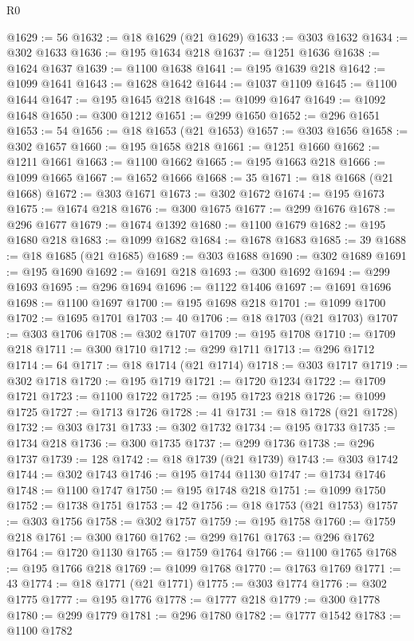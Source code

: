 \begin{lexlean}{R0}
\begin{coremodule}
@1629 := 56
@1632 := @18 @1629 (@21 @1629)
@1633 := @303 @1632
@1634 := @302 @1633
@1636 := @195 @1634 @218
@1637 := @1251 @1636
@1638 := @1624 @1637
@1639 := @1100 @1638
@1641 := @195 @1639 @218
@1642 := @1099 @1641
@1643 := @1628 @1642
@1644 := @1037 @1109
@1645 := @1100 @1644
@1647 := @195 @1645 @218
@1648 := @1099 @1647
@1649 := @1092 @1648
@1650 := @300 @1212
@1651 := @299 @1650
@1652 := @296 @1651
@1653 := 54
@1656 := @18 @1653 (@21 @1653)
@1657 := @303 @1656
@1658 := @302 @1657
@1660 := @195 @1658 @218
@1661 := @1251 @1660
@1662 := @1211 @1661
@1663 := @1100 @1662
@1665 := @195 @1663 @218
@1666 := @1099 @1665
@1667 := @1652 @1666
@1668 := 35
@1671 := @18 @1668 (@21 @1668)
@1672 := @303 @1671
@1673 := @302 @1672
@1674 := @195 @1673
@1675 := @1674 @218
@1676 := @300 @1675
@1677 := @299 @1676
@1678 := @296 @1677
@1679 := @1674 @1392
@1680 := @1100 @1679
@1682 := @195 @1680 @218
@1683 := @1099 @1682
@1684 := @1678 @1683
@1685 := 39
@1688 := @18 @1685 (@21 @1685)
@1689 := @303 @1688
@1690 := @302 @1689
@1691 := @195 @1690
@1692 := @1691 @218
@1693 := @300 @1692
@1694 := @299 @1693
@1695 := @296 @1694
@1696 := @1122 @1406
@1697 := @1691 @1696
@1698 := @1100 @1697
@1700 := @195 @1698 @218
@1701 := @1099 @1700
@1702 := @1695 @1701
@1703 := 40
@1706 := @18 @1703 (@21 @1703)
@1707 := @303 @1706
@1708 := @302 @1707
@1709 := @195 @1708
@1710 := @1709 @218
@1711 := @300 @1710
@1712 := @299 @1711
@1713 := @296 @1712
@1714 := 64
@1717 := @18 @1714 (@21 @1714)
@1718 := @303 @1717
@1719 := @302 @1718
@1720 := @195 @1719
@1721 := @1720 @1234
@1722 := @1709 @1721
@1723 := @1100 @1722
@1725 := @195 @1723 @218
@1726 := @1099 @1725
@1727 := @1713 @1726
@1728 := 41
@1731 := @18 @1728 (@21 @1728)
@1732 := @303 @1731
@1733 := @302 @1732
@1734 := @195 @1733
@1735 := @1734 @218
@1736 := @300 @1735
@1737 := @299 @1736
@1738 := @296 @1737
@1739 := 128
@1742 := @18 @1739 (@21 @1739)
@1743 := @303 @1742
@1744 := @302 @1743
@1746 := @195 @1744 @1130
@1747 := @1734 @1746
@1748 := @1100 @1747
@1750 := @195 @1748 @218
@1751 := @1099 @1750
@1752 := @1738 @1751
@1753 := 42
@1756 := @18 @1753 (@21 @1753)
@1757 := @303 @1756
@1758 := @302 @1757
@1759 := @195 @1758
@1760 := @1759 @218
@1761 := @300 @1760
@1762 := @299 @1761
@1763 := @296 @1762
@1764 := @1720 @1130
@1765 := @1759 @1764
@1766 := @1100 @1765
@1768 := @195 @1766 @218
@1769 := @1099 @1768
@1770 := @1763 @1769
@1771 := 43
@1774 := @18 @1771 (@21 @1771)
@1775 := @303 @1774
@1776 := @302 @1775
@1777 := @195 @1776
@1778 := @1777 @218
@1779 := @300 @1778
@1780 := @299 @1779
@1781 := @296 @1780
@1782 := @1777 @1542
@1783 := @1100 @1782

\end{coremodule}
\end{lexlean}
